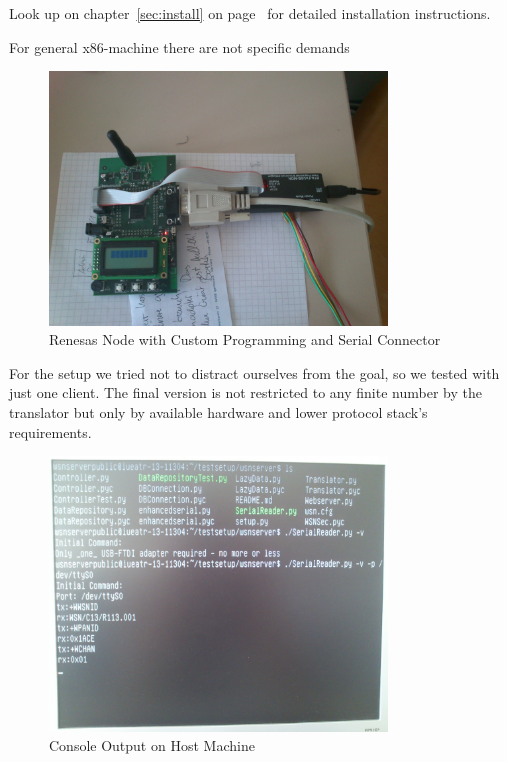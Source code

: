 Look up on chapter~\ref{sec:install} on page~\pageref{sec:install} for detailed installation instructions.

For general x86-machine there are not specific demands 

\begin{figure}[H]
   \centering
   \includegraphics[width=0.8\textwidth]{pic/controller.jpg}%
   \caption{Renesas Node with Custom Programming and Serial Connector}
   \label{fig:nodepic}%
\end{figure}

For the setup we tried not to distract ourselves from the goal, so we tested with just one client. The final version is not restricted
to any finite number by the translator but only by available hardware and lower protocol stack's requirements.

\begin{figure}[H]
   \centering
   \includegraphics[width=0.8\textwidth]{pic/host_machine.jpg}%
   \caption{Console Output on Host Machine}
   \label{fig:hostpic}%
\end{figure}

